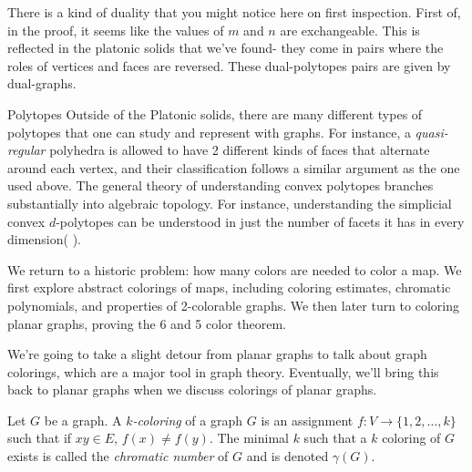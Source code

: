 There is a kind of duality that you might notice here on first inspection. First of, in the proof, it seems like the values of $m$ and $n$ are exchangeable. This is reflected in the platonic solids that we've found- they come in pairs where the roles of vertices and faces are reversed. These dual-polytopes pairs are given by dual-graphs. 

\begin{projectdescription}{Polytopes}
Outside of the Platonic solids, there are many different types of polytopes that one can study and represent with graphs. For instance, a \emph{quasi-regular} polyhedra is allowed to have 2 different kinds of faces that alternate \label{proj:polytope} around each vertex, and their classification follows a similar argument as the one used above. The general theory of understanding convex polytopes branches substantially into algebraic topology. For instance, understanding the simplicial convex $d$-polytopes can be understood in just the number of facets it has in every dimension( \cite{stanley1980number}). 
\end{projectdescription}

\begin{elevator}
We return to a historic problem: how many colors are needed to color a map. We first explore abstract colorings of maps, including coloring estimates, chromatic polynomials, and properties of 2-colorable graphs. We then later turn to coloring planar graphs, proving the 6 and 5 color theorem. 
\end{elevator}
\label{sec:planar:coloring}
We're going to take a slight detour from planar graphs to talk about graph colorings, which are a major tool in graph theory. Eventually, we'll bring this back to planar graphs when we discuss colorings of planar graphs. 
\begin{definition}[Colorings]
 Let $G$ be a graph. A \emph{$k$-coloring} of a graph $G$ is an assignment  $f: V\to \{1,2, \ldots ,k\}$ such that if $xy\in E$, $f(x)\neq f(y)$. The minimal $k$ such that a $k$ coloring of $G$ exists is called the \emph{chromatic number} of $G$ and is denoted $\gamma(G)$. 
\end{definition}

